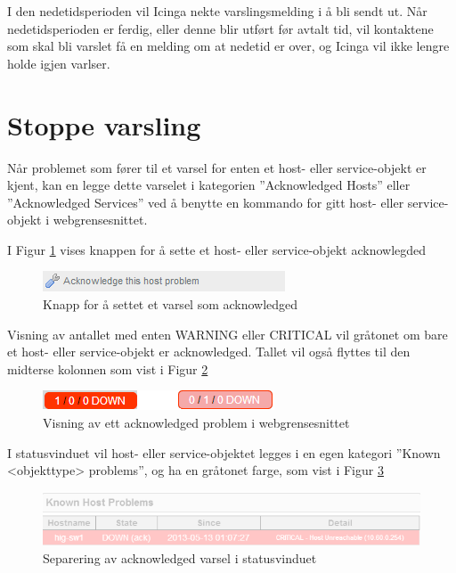 I den nedetidsperioden vil Icinga nekte varslingsmelding i å bli sendt ut. Når nedetidsperioden er ferdig, eller denne blir utført før avtalt tid, vil kontaktene som skal bli varslet få en melding om at nedetid er over, og Icinga vil ikke lengre holde igjen varlser.

\section{Stoppe varsling}
Når problemet som fører til et varsel for enten et host- eller service-objekt er kjent, kan en legge dette varselet i kategorien ''Acknowledged Hosts'' eller
''Acknowledged Services'' ved å benytte en kommando for gitt host- eller service-objekt i webgrensesnittet.

I Figur \ref{ackbutton} vises knappen for å sette et host- eller service-objekt acknowlegded

\begin{figure}[H]
    \centering
    \includegraphics{img/ack_button}
    \caption{Knapp for å settet et varsel som acknowledged}
    \label{ackbutton}
\end{figure}

Visning av antallet med enten WARNING eller CRITICAL vil gråtonet om bare et host- eller service-objekt er acknowledged. Tallet vil også flyttes til den midterse kolonnen som vist i Figur \ref{ackcombined} 

\begin{figure}[H]
    \centering
    \includegraphics{img/ack_combined}
    \caption{Visning av ett acknowledged problem i webgrensesnittet}
    \label{ackcombined}
\end{figure}

I statusvinduet vil host- eller service-objektet legges i en egen kategori ''Known <objekttype> problems'', og ha en gråtonet farge, som vist i Figur \ref{ackstatusvindu}

\begin{figure}[H]
    \centering
    \includegraphics{img/ack_statusvindu}
    \caption{Separering av acknowledged varsel i statusvinduet}
    \label{ackstatusvindu}
\end{figure}


